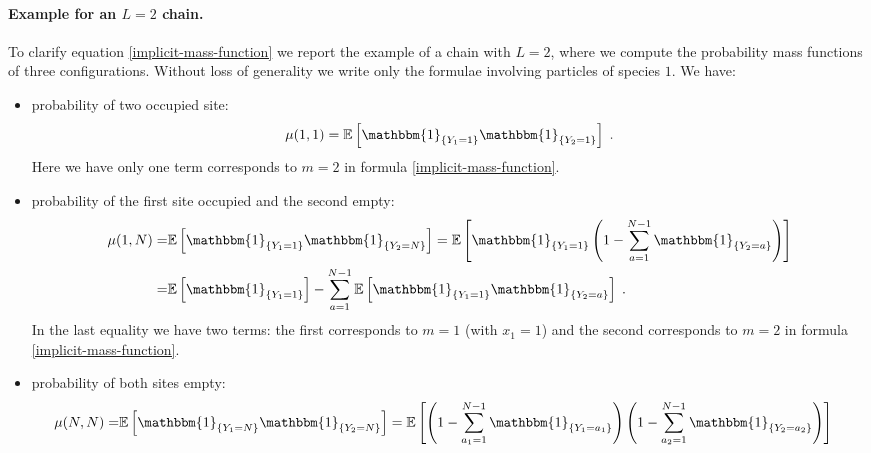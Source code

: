 \documentclass[10pt]{article}
\numberwithin{equation}{section}
\numberwithin{equation}{subsection}
\newcommand{\dt}{\;.}
\begin{document}
\paragraph{Example for an $L=2$ chain.} To clarify equation \eqref{implicit-mass-function} we report the example of a chain with $L=2$, where we compute the probability mass functions of three configurations. Without loss of generality we write only the formulae involving particles of species $1$. We have: 
 \begin{itemize}
 	\item probability of two occupied site:
 	\begin{equation}
 		\mu(1,1)=\mathbb{E}\left[\mathbbm{1}_{\{Y_{1}=1\}}\mathbbm{1}_{\{Y_{2}=1\}}\right]\dt
 	\end{equation}
 	Here we have only one term corresponds to $m=2$ in formula  \eqref{implicit-mass-function}.
 	\item probability of the first site occupied and the second empty:
 	\begin{align}
 		\mu(1,N)=&\mathbb{E}\left[\mathbbm{1}_{\{Y_{1}=1\}}\mathbbm{1}_{\{Y_{2}=N\}}\right]=\mathbb{E}\left[\mathbbm{1}_{\{Y_{1}=1\}}\left(1-\sum_{a=1}^{N-1}\mathbbm{1}_{\{Y_{2}=a\}}\right)\right]\nonumber
 		\\=&
 		\mathbb{E}\left[\mathbbm{1}_{\{Y_{1}=1\}}\right]-\sum_{a=1}^{N-1}\mathbb{E}\left[\mathbbm{1}_{\{Y_{1}=1\}}\mathbbm{1}_{\{Y_{2}=a\}}\right]\dt
 	\end{align}
	{\color{blue}In the last equality we have two terms: the first corresponds to $m=1$ (with $x_{1}=1$) and the second corresponds to $m=2$ in formula \eqref{implicit-mass-function}.}
 	\item probability of both sites empty:
 	\begin{align}
 		\mu(N,N)=&\mathbb{E}\left[\mathbbm{1}_{\{Y_{1}=N\}}\mathbbm{1}_{\{Y_{2}=N\}}\right]=\mathbb{E}\left[\left(1-\sum_{a_{1}=1}^{N-1}\mathbbm{1}_{\{Y_{1}=a_{1}\}}\right)\left(1-\sum_{a_{2}=1}^{N-1}\mathbbm{1}_{\{Y_{2}=a_{2}\}}\right)\right]\nonumber

\end{align}
\end{itemize}
\end{document}
